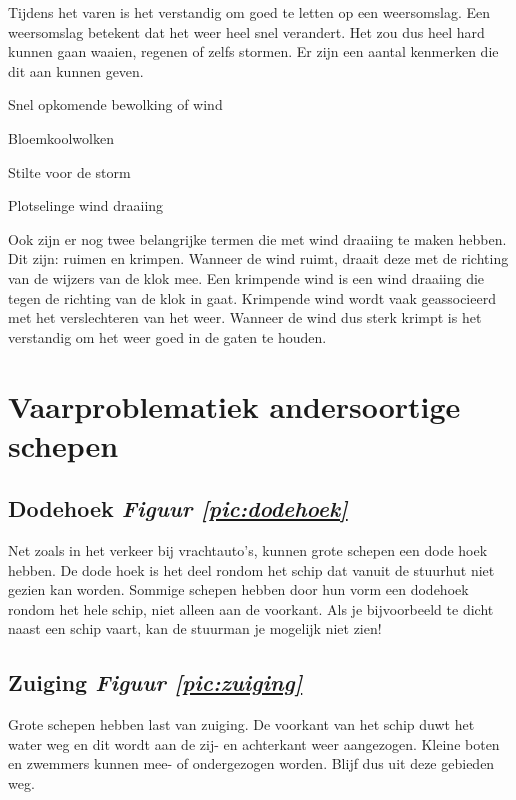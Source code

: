 Tijdens het varen is het verstandig om goed te letten op een weersomslag. Een weersomslag betekent dat het weer heel snel verandert. Het zou dus heel hard kunnen gaan waaien, regenen of zelfs stormen. Er zijn een aantal kenmerken die dit aan kunnen geven. 
\begin{itemize}
    \begin{multicols}{2}
    \item Snel opkomende bewolking of wind
    \item Bloemkoolwolken
    \item Stilte voor de storm
    \item Plotselinge wind draaiing
    \end{multicols}
\end{itemize}
Ook zijn er nog twee belangrijke termen die met wind draaiing te maken hebben. Dit zijn: ruimen en krimpen. Wanneer de wind ruimt, draait deze met de richting van de wijzers van de klok mee. Een krimpende wind is een wind draaiing die tegen de richting van de klok in gaat. Krimpende wind wordt vaak geassocieerd met het verslechteren van het weer. Wanneer de wind dus sterk krimpt is het verstandig om het weer goed in de gaten te houden.


\section{Vaarproblematiek andersoortige schepen}
\subsection{Dodehoek \hfill \textit{Figuur \ref{pic:dodehoek}}}
Net zoals in het verkeer bij vrachtauto's, kunnen grote schepen een dode hoek hebben. De dode hoek is het deel rondom het schip dat vanuit de stuurhut niet gezien kan worden. Sommige schepen hebben door hun vorm een dodehoek rondom het hele schip, niet alleen aan de voorkant. Als je bijvoorbeeld te dicht naast een schip vaart, kan de stuurman je mogelijk niet zien!

\subsection{Zuiging \hfill \textit{Figuur \ref{pic:zuiging}}}
Grote schepen hebben last van zuiging. De voorkant van het schip duwt het water weg en dit wordt aan de zij- en achterkant weer aangezogen. Kleine boten en zwemmers kunnen mee- of ondergezogen worden. Blijf dus uit deze gebieden weg.

